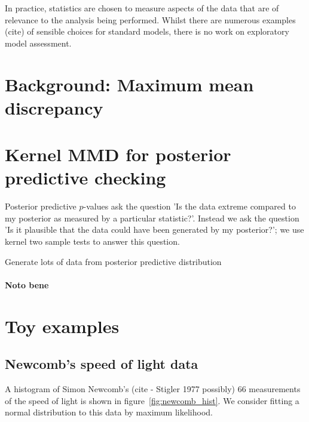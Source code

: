 \documentclass{article}
\begin{document}
In practice, statistics are chosen to measure aspects of the data that are of relevance to the analysis being performed.
Whilst there are numerous examples (cite) of sensible choices for standard models, there is no work on exploratory model assessment.

\section{Background: Maximum mean discrepancy}


\section{Kernel MMD for posterior predictive checking}

Posterior predictive $p$-values ask the question 'Is the data extreme compared to my posterior as measured by a particular statistic?'.
Instead we ask the question 'Is it plausible that the data could have been generated by my posterior?'; we use kernel two sample tests to answer this question.

Generate lots of data from posterior predictive distribution

\paragraph{Noto bene}


\section{Toy examples}

\subsection{Newcomb's speed of light data}


A histogram of Simon Newcomb's (cite - Stigler 1977 possibly) 66 measurements of the speed of light is shown in figure~\ref{fig:newcomb_hist}.
We consider fitting a normal distribution to this data by maximum likelihood\footnotemark.
\end{document}
